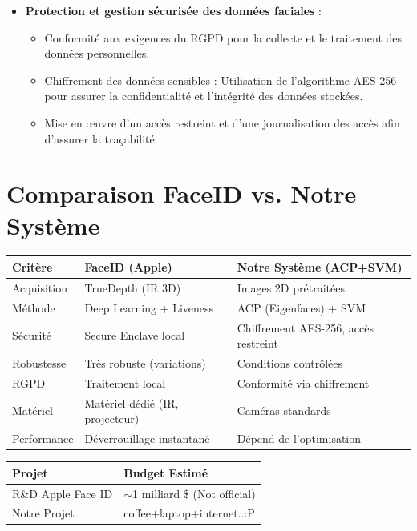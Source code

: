 \documentclass[a4paper,12pt]{report} %
\begin{document}
    \begin{itemize}
        \item \textbf{Protection et gestion sécurisée des données faciales} :
        \begin{itemize}
            \item Conformité aux exigences du RGPD pour la collecte et le traitement des données personnelles.
            \item {Chiffrement des données sensibles} : Utilisation de l'algorithme AES-256 pour assurer la confidentialité et l'intégrité des données stockées.
            \item Mise en œuvre d’un accès restreint et d’une journalisation des accès afin d’assurer la traçabilité.
        \end{itemize}
        
    \end{itemize}

\chapter{Comparaison FaceID vs. Notre Système}
\begin{center}
\begin{tabular}{|p{3cm}|p{4cm}|p{4cm}|}
\hline
\textbf{Critère} & \textbf{FaceID (Apple)} & \textbf{Notre Système (ACP+SVM)} \\
\hline
Acquisition & TrueDepth (IR 3D) & Images 2D prétraitées \\
\hline
Méthode & Deep Learning + Liveness & ACP (Eigenfaces) + SVM \\
\hline
Sécurité & Secure Enclave local & Chiffrement AES-256, accès restreint \\
\hline
Robustesse & Très robuste (variations) & Conditions contrôlées \\
\hline
RGPD & Traitement local & Conformité via chiffrement \\
\hline
Matériel & Matériel dédié (IR, projecteur) & Caméras standards \\
\hline
Performance & Déverrouillage instantané & Dépend de l'optimisation \\
\hline
\end{tabular}
\end{center}


    \vspace{0.5cm}
    \begin{center}
    \begin{tabular}{|l|l|}
        \hline
        \textbf{Projet} & \textbf{Budget Estimé} \\
        \hline
        R\&D Apple Face ID & $\sim$1 milliard \$ (Not official) \\
        \hline
        Notre Projet & coffee+laptop+internet..:P \\
        \hline
    \end{tabular}
    \end{center}
    \vspace{0.5cm}
\end{document}
